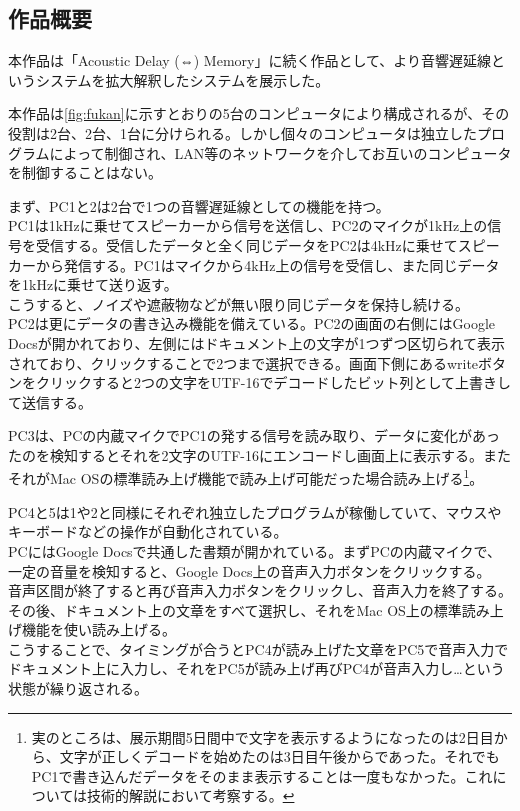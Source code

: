 \documentclass[a4paper,report]{jsbook}
\begin{document}
\subsection{作品概要}\label{ux4f5cux54c1ux6982ux8981-2}

本作品は「Acoustic Delay (⇔)
Memory」に続く作品として、より音響遅延線というシステムを拡大解釈したシステムを展示した。

本作品は\cref{fig:fukan}に示すとおりの5台のコンピュータにより構成されるが、その役割は2台、2台、1台に分けられる。しかし個々のコンピュータは独立したプログラムによって制御され、LAN等のネットワークを介してお互いのコンピュータを制御することはない。

まず、PC1と2は2台で1つの音響遅延線としての機能を持つ。\\
PC1は1kHzに乗せてスピーカーから信号を送信し、PC2のマイクが1kHz上の信号を受信する。受信したデータと全く同じデータをPC2は4kHzに乗せてスピーカーから発信する。PC1はマイクから4kHz上の信号を受信し、また同じデータを1kHzに乗せて送り返す。\\
こうすると、ノイズや遮蔽物などが無い限り同じデータを保持し続ける。\\
PC2は更にデータの書き込み機能を備えている。PC2の画面の右側にはGoogle
Docsが開かれており、左側にはドキュメント上の文字が1つずつ区切られて表示されており、クリックすることで2つまで選択できる。画面下側にあるwriteボタンをクリックすると2つの文字をUTF-16でデコードしたビット列として上書きして送信する。

PC3は、PCの内蔵マイクでPC1の発する信号を読み取り、データに変化があったのを検知するとそれを2文字のUTF-16にエンコードし画面上に表示する。またそれがMac
OSの標準読み上げ機能で読み上げ可能だった場合読み上げる\footnote{実のところは、展示期間5日間中で文字を表示するようになったのは2日目から、文字が正しくデコードを始めたのは3日目午後からであった。それでもPC1で書き込んだデータをそのまま表示することは一度もなかった。これについては技術的解説において考察する。}。

PC4と5は1や2と同様にそれぞれ独立したプログラムが稼働していて、マウスやキーボードなどの操作が自動化されている。\\
PCにはGoogle
Docsで共通した書類が開かれている。まずPCの内蔵マイクで、一定の音量を検知すると、Google
Docs上の音声入力ボタンをクリックする。\\
音声区間が終了すると再び音声入力ボタンをクリックし、音声入力を終了する。その後、ドキュメント上の文章をすべて選択し、それをMac
OS上の標準読み上げ機能を使い読み上げる。\\
こうすることで、タイミングが合うとPC4が読み上げた文章をPC5で音声入力でドキュメント上に入力し、それをPC5が読み上げ再びPC4が音声入力し\ldots{}という状態が繰り返される。
\end{document}

